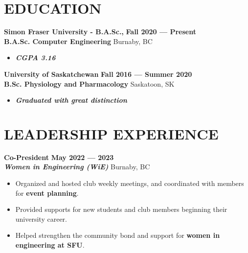 \documentclass[letterpaper,11pt]{article}
\newcommand{\Item} [1] {
    \item\small{{#1 \vspace{-2pt}}}
}
\newcommand{\employer} [5] {
    {\textbf{#3} \hfill \textbf{#4 --- #5}\\ \textbf{\emph{#1}} \hfill #2\\}
}
\newcommand{\school} [6] {
    {\textbf{#1} \hfill \textbf{#5 --- #6}\\ \textbf{#3} \hfill #2\\ \begin{itemize}[topsep=0pt,itemsep=-2pt]\item{\textbf{\emph{#4}}}\end{itemize}}
}
\newcommand{\workItemListStart} [0] {
    \vspace{-1pt}
    \begin{itemize}[topsep=0pt,itemsep=-2pt]
}
\newcommand{\workItemListEnd} [0] {
    \end{itemize}
    \vspace{1pt}
}
\begin{document}
    \section{EDUCATION}
    \school{Simon Fraser University - B.A.Sc.,}{Burnaby, BC}{B.A.Sc. Computer Engineering}{CGPA 3.16}{Fall 2020}{Present}
    \school{University of Saskatchewan}{Saskatoon, SK}{B.Sc. Physiology and Pharmacology}{Graduated with great distinction}{Fall 2016}{Summer 2020}

    \section{LEADERSHIP EXPERIENCE}
    \employer{Women in Engineering (WiE)}{Burnaby, BC}{Co-President}{May 2022}{2023}
    \workItemListStart{}
        \Item{Organized and hosted club weekly meetings, and coordinated with members for \textbf{event planning}.}
        \Item{Provided supports for new students and club members beginning their university career.}
        \Item{Helped strengthen the community bond and support for \textbf{women in engineering at SFU}.}

    \workItemListEnd{}
\end{document}
